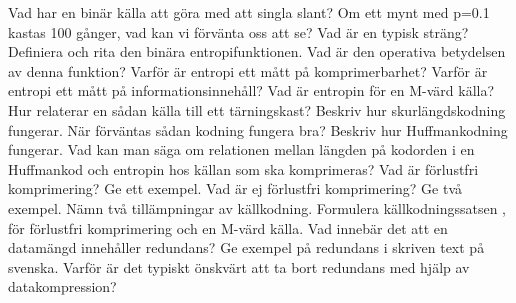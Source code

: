 \documentclass[a4paper,11pt]{article}
\begin{document}
\newline
\newline
Vad har en binär källa att göra med att singla slant?
\newline
\newline
Om ett mynt med p=0.1 kastas 100 gånger, vad kan vi förvänta oss att se?
\newline
\newline
Vad är en typisk sträng?
\newline
\newline
Definiera och rita den binära entropifunktionen. Vad är den operativa betydelsen av denna 
funktion? 
\newline
\newline
Varför är entropi ett mått på komprimerbarhet? 
\newline
\newline
Varför är entropi ett mått på informationsinnehåll?
\newline
\newline
Vad är entropin för en M-värd källa? Hur relaterar en sådan källa till ett tärningskast?
\newline
\newline
Beskriv hur skurlängdskodning fungerar. När förväntas sådan kodning fungera bra? 
\newline
\newline
Beskriv hur Huffmankodning fungerar.
\newline
\newline
Vad kan man säga om relationen mellan längden på kodorden i en Huffmankod och entropin
hos källan som ska komprimeras?
\newline
\newline
Vad är förlustfri komprimering? Ge ett exempel.
\newline
\newline
Vad är ej förlustfri komprimering? Ge två exempel.
\newline
\newline
Nämn två tillämpningar av källkodning.
\newline
\newline
Formulera 
källkodningssatsen
, för förlustfri komprimering och en M-värd källa.
\newline
\newline
Vad innebär det att en datamängd innehåller redundans?  Ge exempel på redundans i skriven
text på svenska.
\newline
\newline
Varför är det typiskt önskvärt att ta bort redundans med hjälp av datakompression?
\end{document}
